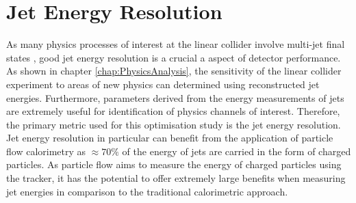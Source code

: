 
\section{Jet Energy Resolution}
\label{sec:optstudiesmetric}
As many physics processes of interest at the linear collider involve multi-jet final states \cite{Abramowicz:2016zbo}, good jet energy resolution is a crucial a aspect of detector performance.  As shown in chapter \ref{chap:PhysicsAnalysis}, the sensitivity of the linear collider experiment to areas of new physics can determined using reconstructed jet energies.  Furthermore, parameters derived from the energy measurements of jets are extremely useful for identification of physics channels of interest.  Therefore, the primary metric used for this optimisation study is the jet energy resolution.  Jet energy resolution in particular can benefit from the application of particle flow calorimetry as $\approx 70 \%$ of the energy of jets are carried in the form of charged particles.  As particle flow aims to measure the energy of charged particles using the tracker, it has the potential to offer extremely large benefits when measuring jet energies in comparison to the traditional calorimetric approach.  


